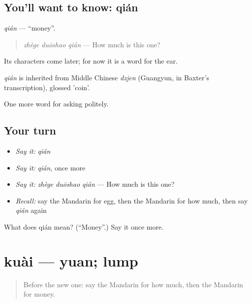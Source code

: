 \subsection*{You'll want to know: qián}
\emph{qián} — \textquotedblleft{}money\textquotedblright{}.

\begin{quote}
\emph{zhège duōshao qián} — How much is this one?
\end{quote}

Its characters come later; for now it is a word for the ear.

\begin{cousinweb}
\emph{qián} is inherited from Middle Chinese \emph{dzjen} (Guangyun, in Baxter's transcription), glossed 'coin'.
\end{cousinweb}

\begin{grammarlens}[title={What you've built}]
One more word for asking politely.
\end{grammarlens}

\subsection*{Your turn}
\begin{itemize}
\raggedright
  \item \emph{Say it:} \emph{qián}
  \item \emph{Say it:} \emph{qián}, once more
  \item \emph{Say it:} \emph{zhège duōshao qián} — How much is this one?
  \item \emph{Recall:} say the Mandarin for egg, then the Mandarin for how much, then say \emph{qián} again
\end{itemize}

\begin{tcolorbox}[breakable,colback=teal!4,colframe=teal!35!black,title={Before you move on}]
What does qián mean? (\textquotedblleft{}Money\textquotedblright{}.) Say it once more.
\end{tcolorbox}
\section[kuài]{kuài — yuan; lump}

\label{lesson:ZH-C41-kuai}



\begin{quote}
Before the new one: say the Mandarin for how much, then the Mandarin for money.
\end{quote}

